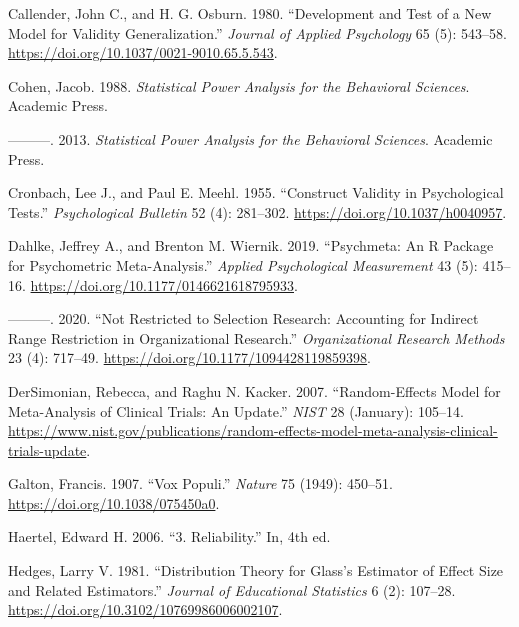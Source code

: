 \documentclass[
  letterpaper,
  DIV=11,
  numbers=noendperiod]{scrreprt}
\newlength{\cslhangindent}
\newlength{\cslentryspacingunit} %
\newenvironment{CSLReferences}[2] %
 {%
  \setlength{\parindent}{0pt}
  \ifodd #1
  \let\oldpar\par
  \def\par{\hangindent=\cslhangindent\oldpar}
  \fi
  \setlength{\parskip}{#2\cslentryspacingunit}
 }%
 {}
\begin{document}
\begin{CSLReferences}{1}{0}
\leavevmode{}%
Callender, John C., and H. G. Osburn. 1980. {``Development and Test of a
New Model for Validity Generalization.''} \emph{Journal of Applied
Psychology} 65 (5): 543--58.
\url{https://doi.org/10.1037/0021-9010.65.5.543}.

\leavevmode{}%
Cohen, Jacob. 1988. \emph{Statistical Power Analysis for the Behavioral
Sciences}. Academic Press.

\leavevmode{}%
---------. 2013. \emph{Statistical Power Analysis for the Behavioral
Sciences}. Academic Press.

\leavevmode{}%
Cronbach, Lee J., and Paul E. Meehl. 1955. {``Construct Validity in
Psychological Tests.''} \emph{Psychological Bulletin} 52 (4): 281--302.
\url{https://doi.org/10.1037/h0040957}.

\leavevmode{}%
Dahlke, Jeffrey A., and Brenton M. Wiernik. 2019. {``Psychmeta: An R
Package for Psychometric Meta-Analysis.''} \emph{Applied Psychological
Measurement} 43 (5): 415--16.
\url{https://doi.org/10.1177/0146621618795933}.

\leavevmode{}%
---------. 2020. {``Not Restricted to Selection Research: Accounting for
Indirect Range Restriction in Organizational Research.''}
\emph{Organizational Research Methods} 23 (4): 717--49.
\url{https://doi.org/10.1177/1094428119859398}.

\leavevmode{}%
DerSimonian, Rebecca, and Raghu N. Kacker. 2007. {``Random-Effects Model
for Meta-Analysis of Clinical Trials: An Update.''} \emph{NIST} 28
(January): 105--14.
\url{https://www.nist.gov/publications/random-effects-model-meta-analysis-clinical-trials-update}.

\leavevmode{}%
Galton, Francis. 1907. {``Vox Populi.''} \emph{Nature} 75 (1949):
450--51. \url{https://doi.org/10.1038/075450a0}.

\leavevmode{}%
Haertel, Edward H. 2006. {``3. Reliability.''} In, 4th ed.

\leavevmode{}%
Hedges, Larry V. 1981. {``Distribution Theory for Glass's Estimator of
Effect Size and Related Estimators.''} \emph{Journal of Educational
Statistics} 6 (2): 107--28.
\url{https://doi.org/10.3102/10769986006002107}.


\end{CSLReferences}
\end{document}
